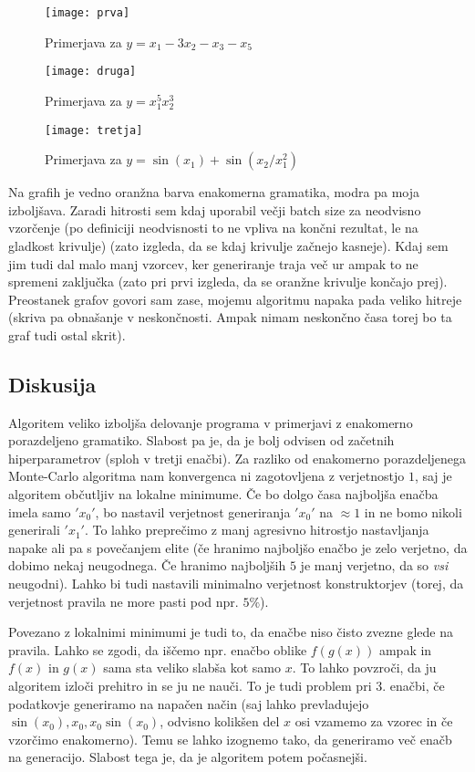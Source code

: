 \documentclass{article}
\begin{document}
\begin{figure}[h]
    \texttt{[image: prva]}
    \caption{Primerjava za \(y=x_1-3x_2-x_3-x_5\)}
\end{figure}
\begin{figure}[h]
    \texttt{[image: druga]}
    \caption{Primerjava za \(y=x_1^5x_2^3\)}
\end{figure}
\begin{figure}[h]
    \texttt{[image: tretja]}
    \caption{Primerjava za \(y=\sin(x_1)+\sin(x_2/x_1^2)\)}
\end{figure}
Na grafih je vedno oranžna barva enakomerna gramatika, modra pa moja izboljšava. Zaradi hitrosti sem kdaj uporabil večji batch size za neodvisno vzorčenje (po definiciji neodvisnosti to ne vpliva na končni rezultat, le na gladkost krivulje) (zato izgleda, da se kdaj krivulje začnejo kasneje). Kdaj sem jim tudi dal malo manj vzorcev, ker generiranje traja več ur ampak to ne spremeni zaključka (zato pri prvi izgleda, da se oranžne krivulje končajo prej). Preostanek grafov govori sam zase, mojemu algoritmu napaka pada veliko hitreje (skriva pa obnašanje v neskončnosti. Ampak nimam neskončno časa torej bo ta graf tudi ostal skrit).
\subsection*{Diskusija} Algoritem veliko izboljša delovanje programa v primerjavi z enakomerno porazdeljeno gramatiko. Slabost pa je, da je bolj odvisen od začetnih hiperparametrov (sploh v tretji enačbi). Za razliko od enakomerno porazdeljenega Monte-Carlo algoritma nam konvergenca ni zagotovljena z verjetnostjo \(1\), saj je algoritem občutljiv na lokalne minimume. Če bo dolgo časa najboljša enačba imela samo \('x_0'\), bo nastavil verjetnost generiranja \('x_0'\) na \(\approx 1\) in ne bomo nikoli generirali \('x_1'\). To lahko preprečimo z manj agresivno hitrostjo nastavljanja napake ali pa s povečanjem elite (če hranimo najboljšo enačbo je zelo verjetno, da dobimo nekaj neugodnega. Če hranimo najboljših \(5\) je manj verjetno, da so \emph{vsi} neugodni). Lahko bi tudi nastavili minimalno verjetnost konstruktorjev (torej, da verjetnost pravila ne more pasti pod npr. \(5\%\)).

Povezano z lokalnimi minimumi je tudi to, da enačbe niso čisto zvezne glede na pravila. Lahko se zgodi, da iščemo npr. enačbo oblike \(f(g(x))\) ampak in \(f(x)\) in \(g(x)\) sama sta veliko slabša kot samo \(x\). To lahko povzroči, da ju algoritem izloči prehitro in se ju ne nauči. To je tudi problem pri 3. enačbi, če podatkovje generiramo na napačen način (saj lahko prevladujejo \(\sin(x_0), x_0, x_0\sin(x_0)\), odvisno kolikšen del \(x\) osi vzamemo za vzorec in če vzorčimo enakomerno). Temu se lahko izognemo tako, da generiramo več enačb na generacijo. Slabost tega je, da je algoritem potem počasnejši.
\end{document}
